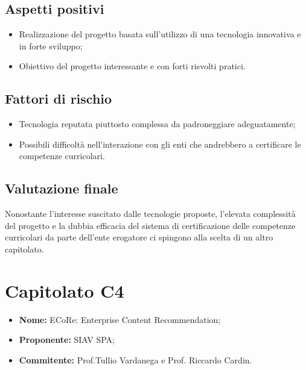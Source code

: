 \documentclass[openany,12pt,a4paper]{report}
\begin{document}
\subsection{Aspetti positivi}

\begin{itemize}
    \item Realizzazione del progetto basata sull'utilizzo di una tecnologia innovativa e in forte sviluppo;
    
    \item Obiettivo del progetto interessante e con forti risvolti pratici.
\end{itemize}

\subsection{Fattori di rischio}

\begin{itemize}
    \item Tecnologia reputata piuttosto complessa da padroneggiare adeguatamente;
    
    \item Possibili difficoltà nell'interazione con gli enti che andrebbero a certificare le competenze curricolari.
\end{itemize}

\subsection{Valutazione finale}

Nonostante l'interesse suscitato dalle tecnologie proposte, l'elevata complessità del progetto e la dubbia efficacia del sistema di certificazione delle competenze curricolari da parte dell'ente erogatore ci spingono alla scelta di un altro capitolato.


\section{Capitolato C4}

\begin{itemize}
    \item \textbf{Nome:} ECoRe: Enterprise Content Recommendation;
    \item \textbf{Proponente:} SIAV SPA;
    \item \textbf{Commitente:} Prof.Tullio Vardanega e Prof. Riccardo Cardin.
\end{itemize}
\end{document}
